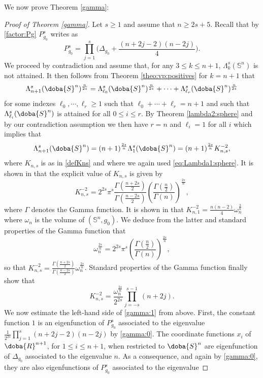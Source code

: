 \documentclass[10pt]{amsart}
\numberwithin{equation}{section}
\def\La{{\Lambda}}
\gdef\mR{\doba{R}}
\gdef\mS{\doba{S}}
\theoremstyle{plain}
\theoremstyle{remark}
\begin{document}
We now prove Theorem \ref{gamma}:

\begin{proof}[Proof of Theorem \ref{gamma}]
Let $s \ge 1$ and assume that $n \ge 2s+5$. Recall that by \eqref{factor:Pg} $P_{g_0}^s$ writes as 
\begin{equation} \label{gamma:0}
 P_{g_0}^{s} = \prod_{j=1}^s \Big( \Delta_{g_0} + \frac{(n+2j-2)(n-2j)}{4} \Big). 
 \end{equation}
We proceed by contradiction and assume that, for any $3 \le k \le n+1$, $\Lambda_k^s(\mathbb{S}^n)$ is not attained. It then follows from Theorem \ref{theo:vp:positives} for $k=n+1$ that 
$$\La_{n+1}^s(\mS^n)^{\frac{n}{2s}}= \La_{\ell_0}^s(\mS^n)^{\frac{n}{2s}} + \cdots+ \La_{\ell_r}^s(\mS^n)^{\frac{n}{2s}}$$
for some indexes $\ell_0,\cdots,\ell_r \ge 1$ such that $\ell_0 + \cdots + \ell_r=n+1$ and such that $\La_{\ell_i}^s(\mS^n)$ is attained for all $0 \le i \le r$. By Theorem \ref{lambda2:sphere} and by our contradiction assumption we then have $r=n$ and $\ell_i=1$ for all $i$ which implies 
that 
\begin{equation} \label{gamma:1} 
\La_{n+1}^s(\mS^n)= (n+1)^{\frac{2s}{n}} \La_1^s(\mS^n) = (n+1)^{\frac{2s}{n}} K_{n,s}^{-2},
\end{equation}
where $K_{n,s}$ is as in \eqref{defKns} and where we again used \eqref{eq:Lambda1:sphere}. It is shown in \cite{LiebSharpConstants} that the explicit value of $K_{n,s}$ is given by 
$$ K_{n,s}^{-2} = 2^{2s} \pi^s \frac{\Gamma\left( \frac{n+2s}{2}\right)}{\Gamma\left( \frac{n-2s}{2}\right)} \left( \frac{\Gamma\left( \frac{n}{2}\right)}{\Gamma(n)} \right)^{\frac{2s}{n}}, $$
where $\Gamma$ denotes the Gamma function. It is shown in \cite{AubinSobolev, Talenti} that $K_{n,1}^{-2} =  \frac{n(n-2)}{4} \omega_n^{\frac{2}{n}}$ where $\omega_n$ is the volume of $(\mathbb{S}^n, g_0)$. 
We deduce from the latter and standard properties of the Gamma function that 
$$\omega_n^{\frac{2s}{n}}=2^{2s}\pi^s   \left( \frac{\Gamma\left( \frac{n}{2}\right)}{\Gamma(n)} \right)^{\frac{2s}{n}},$$
so that $K_{n,s}^{-2} = \frac{\Gamma\left( \frac{n+2s}{2}\right)}{\Gamma\left( \frac{n-2s}{2}\right)} \omega_n^{\frac{2s}{n}}$. Standard properties of the Gamma function finally show that 
\begin{equation} \label{gamma:2} 
K_{n,s}^{-2} =  \frac{\omega_n^{\frac{2s}{n}}}{2^{2s}} \prod_{j=-s}^{s-1} (n+2j) . 
\end{equation}
We now estimate the left-hand side of \eqref{gamma:1} from above. First, the constant function $1$ is an eigenfunction of $P_{g_0}^s$ associated to the eigenvalue $ \frac{1}{2^{2s}} \prod_{j=1}^s (n+2j-2)(n-2j)$ by \eqref{gamma:0}. The coordinate functions $x_i$ of $\mR^{n+1}$, for $1 \le i \le n+1$, when restricted to $\mS^n$ are eigenfunction of $\Delta_{g_0}$ associated to the eigenvalue $n$. As a consequence, and again by \eqref{gamma:0}, they are also eigenfunctions of $P_{g_0}^s$ associated to the eigenvalue 

\end{proof}
\end{document}
